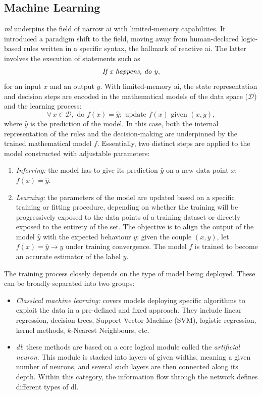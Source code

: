 \subsection{Machine Learning} 
\textit{\gls{ml}} underpins the field of narrow \gls{ai} with limited-memory capabilities. It introduced a paradigm shift to the field, moving away from human-declared logic-based rules written in a specific syntax, the hallmark of reactive \gls{ai}. The latter involves the execution of statements such as \[\textrm{\textit{If x happens, do y}},\] for an input $x$ and an output $y$. With limited-memory \gls{ai}, the state representation and decision steps are encoded in the mathematical models of the data space ($\mathcal{D}$) and the learning process: \[\forall\, x \in \mathcal{D}, \textrm{ do }f(x) = \hat{y}; \textrm{ update }f(x) \textrm{ given } (x, y),\] where $\hat{y}$ is the prediction of the model. In this case, both the internal representation of the rules and the decision-making are underpinned by the trained mathematical model $f$. Essentially, two distinct steps are applied to the model constructed with adjustable parameters: 
\begin{enumerate}
    \item \textit{Inferring:} the model has to give its prediction $\hat{y}$ on a new data point $x$: $f(x) = \hat{y}$.
    \item \textit{Learning:} the parameters of the model are updated based on a specific training or fitting procedure, depending on whether the training will be progressively exposed to the data points of a training dataset or directly exposed to the entirety of the set. The objective is to align the output of the model $\hat{y}$ with the expected behaviour $y$: given the couple $(x, y)$, let $f(x) = \hat{y} \rightarrow y$ under training convergence. The model $f$ is trained to become an accurate estimator of the label $y$.
\end{enumerate}
The training process closely depends on the type of model being deployed. These can be broadly separated into two groups:
\begin{itemize}
    \item \textit{Classical machine learning:} covers models deploying specific algorithms to exploit the data in a pre-defined and fixed approach. They include linear regression, decision trees, Support Vector Machine (SVM), logistic regression, kernel methods, $k$-Nearest Neighbours, etc.
    \item \textit{\gls{dl}}: these methods are based on a core logical module called the \textit{artificial neuron}. This module is stacked into layers of given widths, meaning a given number of neurons, and several such layers are then connected along its depth. Within this category, the information flow through the network defines different types of \gls{dl}.
\end{itemize}
